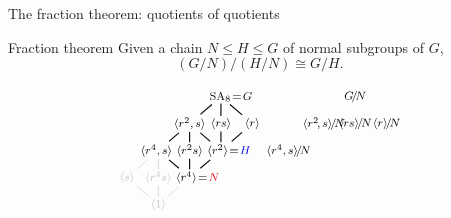 \documentclass[8pt, handout]{beamer}
\begin{document}
\begin{frame}{The fraction theorem: quotients of quotients} %
    
  \begin{block}{Fraction theorem}
    Given a chain $N\leq H\leq G$ of normal subgroups of $G$, \vspace{-1mm}
    \[
    (G/N)/(H/N)\cong G/H.
    \]
  \end{block}

  \vspace{-3mm}

  \[
  \begin{tikzpicture}[node distance=1cm,shorten >= -2pt, shorten <= -2pt,scale=.45,xscale=1]
    \begin{scope}[shift={(0,0)}]
     \tikzstyle{every node}=[font=\footnotesize]
      \node(G) at (3.5,6) {$\hspace{5mm}\SA_8\!=\!G$};
      \node(rs) at (3.5,4.5) {$\<rs\>$};
      \node(r2-s) at (1.75,4.5) {$\<r^2,s\>$};
      \node(r) at (5.25,4.5) {$\<r\>$};
      \node(r4-s) at (0,3) {\hspace{-1mm}$\<r^4,s\>$};
      \node(r2s) at (1.75,3) {$\<r^2s\>$};
      \node(r2) at (3.5,3) {\hspace{4mm}$\<r^2\>\!=\!\Balert{H}$};
      \node(s) at (-1.75,1.5) {\color{faded}$\<s\>$};
      \node(r4s) at (0,1.5) {\color{faded}$\<r^4s\>$};
      \node(r4) at (1.75,1.5) {\hspace{4mm}$\<r^4\>\!=\!\Alert{N}$};
      \node(1) at (0,0) {\color{faded}$\<1\>$};
      \draw[faded] (1) -- (s);
      \draw[faded] (1) -- (r4s);
      \draw[faded] (1) -- (r4);
      \draw[faded] (s) -- (r4-s);
      \draw[faded] (r4s) -- (r4-s);
      \draw[thick] (r4) -- (r4-s);
      \draw[thick] (r4) -- (r2s);
      \draw[thick] (r4) -- (r2);
      \draw[thick] (r4-s) -- (r2-s);
      \draw[thick] (r2s) -- (r2-s);
      \draw[thick] (r2) -- (r2-s);
      \draw[thick] (r2) -- (r);
      \draw[thick] (r2) -- (rs);
      \draw[thick] (r2-s) -- (G);
      \draw[thick] (r) -- (G);
      \draw[thick] (rs) -- (G);
    \end{scope}
    \begin{scope}[shift={(7.5,0)}]
     \tikzstyle{every node}=[font=\footnotesize]
      \node(G) at (3.5,6) {$G\!/\!N$};
      \node(rs) at (3.5,4.5) {$\<rs\>\!/\!N$};
      \node(r2-s) at (1.75,4.5) {$\<r^2\!,s\>\!/\!N$};
      \node(r) at (5.25,4.5) {$\<r\>\!/\!N$};
      \node(r4-s) at (0,3) {\hspace{-2mm}$\<r^4,s\>\!/\!N$};

\end{scope}
\end{tikzpicture}\]
\end{frame}
\end{document}
